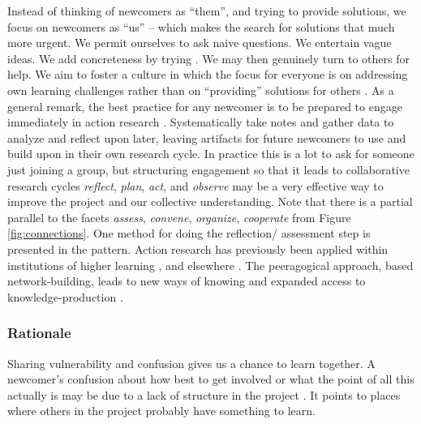 Instead of thinking of newcomers as ``them'', and trying to provide
solutions, we focus on newcomers as ``us'' -- which makes the search
for solutions that much more urgent.  We permit ourselves to ask naive
questions.  We entertain vague ideas.  We add concreteness by trying
.  We may then genuinely turn to
others for help.
We aim to foster a culture in which the focus for everyone is on
addressing own learning challenges rather than on ``providing''
solutions for others \cite{boud2005peer}.
%
As a general remark, the best practice for any newcomer is to be
prepared to engage immediately in action research
\cite{lewin1946action}.  Systematically take notes and gather data to
analyze and reflect upon later, leaving artifacts for future newcomers
to use and build upon in their own research cycle.  In practice this is a
lot to ask for someone just joining a group, but structuring
engagement so that it leads to collaborative research cycles
\emph{reflect}, \emph{plan}, \emph{act}, and \emph{observe} may be a
very effective way to improve the project and our collective
understanding.
Note that there is a partial parallel to the facets \emph{assess},
\emph{convene}, \emph{organize}, \emph{cooperate} from Figure
\ref{fig:connections}.  One method for doing the reflection\slash
assessment step is presented in the  pattern.
Action research has previously been applied within institutions of
higher learning \cite{action-research-OU}, and elsewhere
\cite{trist1951some,bergold2012participatory}.
%
The peeragogical approach, based network-building,
leads to new ways of knowing and expanded access to
knowledge-production \cite{gilbert2012being,wagner2008new}.


%
\subsubsection*{Rationale} 
%
Sharing vulnerability and confusion gives us a chance to learn
together.  A newcomer's confusion about how best to get involved or
what the point of all this actually is may be due to a lack of
structure in the project .  It points to places
where others in the project probably have something to learn.
%

